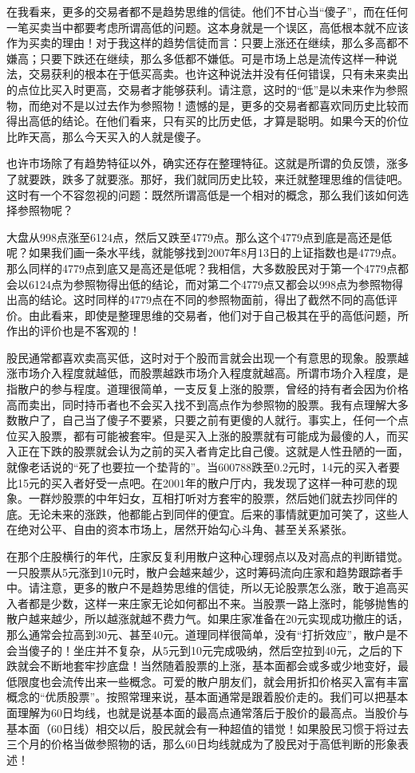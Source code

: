 在我看来，更多的交易者都不是趋势思维的信徒。他们不甘心当“傻子”，而在任何一笔买卖当中都要考虑所谓高低的问题。这本身就是一个误区，高低根本就不应该作为买卖的理由！对于我这样的趋势信徒而言：只要上涨还在继续，那么多高都不嫌高；只要下跌还在继续，那么多低都不嫌低。可是市场上总是流传这样一种说法，交易获利的根本在于低买高卖。也许这种说法并没有任何错误，只有未来卖出的点位比买入时更高，交易者才能够获利。请注意，这时的“低”是以未来作为参照物，而绝对不是以过去作为参照物！遗憾的是，更多的交易者都喜欢同历史比较而得出高低的结论。在他们看来，只有买的比历史低，才算是聪明。如果今天的价位比昨天高，那么今天买入的人就是傻子。

也许市场除了有趋势特征以外，确实还存在整理特征。这就是所谓的负反馈，涨多了就要跌，跌多了就要涨。那好，我们就同历史比较，来迁就整理思维的信徒吧。这时有一个不容忽视的问题：既然所谓高低是一个相对的概念，那么我们该如何选择参照物呢？

大盘从998点涨至6124点，然后又跌至4779点。那么这个4779点到底是高还是低呢？如果我们画一条水平线，就能够找到2007年8月13日的上证指数也是4779点。那么同样的4779点到底又是高还是低呢？我相信，大多数股民对于第一个4779点都会以6124点为参照物得出低的结论，而对第二个4779点又都会以998点为参照物得出高的结论。这时同样的4779点在不同的参照物面前，得出了截然不同的高低评价。由此看来，即使是整理思维的交易者，他们对于自己极其在乎的高低问题，所作出的评价也是不客观的！

股民通常都喜欢卖高买低，这时对于个股而言就会出现一个有意思的现象。股票越涨市场介入程度就越低，而股票越跌市场介入程度就越高。所谓市场介入程度，是指散户的参与程度。道理很简单，一支反复上涨的股票，曾经的持有者会因为价格高而卖出，同时持币者也不会买入找不到高点作为参照物的股票。我有点理解大多数散户了，自己当了傻子不要紧，只要之前有更傻的人就行。事实上，任何一个点位买入股票，都有可能被套牢。但是买入上涨的股票就有可能成为最傻的人，而买入正在下跌的股票就会认为之前的买入者肯定比自己傻。这就是人性丑陋的一面，就像老话说的“死了也要拉一个垫背的”。当600788跌至0.2元时，14元的买入者要比15元的买入者好受一点吧。在2001年的散户厅内，我发现了这样一种可悲的现象。一群炒股票的中年妇女，互相打听对方套牢的股票，然后她们就去抄同伴的底。无论未来的涨跌，他都能占到同伴的便宜。后来的事情就更加可笑了，这些人在绝对公平、自由的资本市场上，居然开始勾心斗角、甚至关系紧张。

在那个庄股横行的年代，庄家反复利用散户这种心理弱点以及对高点的判断错觉。一只股票从5元涨到10元时，散户会越来越少，这时筹码流向庄家和趋势跟踪者手中。请注意，更多的散户不是趋势思维的信徒，所以无论股票怎么涨，敢于追高买入者都是少数，这样一来庄家无论如何都出不来。当股票一路上涨时，能够抛售的散户越来越少，所以越涨就越不费力气。如果庄家准备在20元实现成功撤庄的话，那么通常会拉高到30元、甚至40元。道理同样很简单，没有“打折效应”，散户是不会当傻子的！坐庄并不复杂，从5元到10元完成吸纳，然后空拉到40元，之后的下跌就会不断地套牢抄底盘！当然随着股票的上涨，基本面都会或多或少地变好，最低限度也会流传出来一些概念。可爱的散户朋友们，就会用折扣价格买入富有丰富概念的“优质股票”。按照常理来说，基本面通常是跟着股价走的。我们可以把基本面理解为60日均线，也就是说基本面的最高点通常落后于股价的最高点。当股价与基本面（60日线）相交以后，股民就会有一种超值的错觉！如果股民习惯于将过去三个月的价格当做参照物的话，那么60日均线就成为了股民对于高低判断的形象表述！

